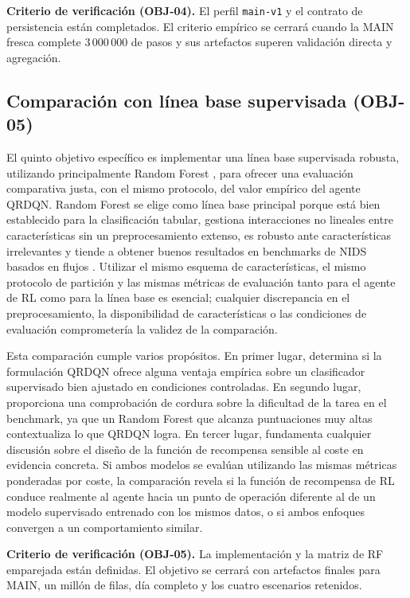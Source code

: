 \textbf{Criterio de verificación (OBJ-04).} El perfil \texttt{main-v1} y el contrato de persistencia están completados. El criterio empírico se cerrará cuando la MAIN fresca complete $3\,000\,000$ de pasos y sus artefactos superen validación directa y agregación.

\subsection{Comparación con línea base supervisada (OBJ-05)}
El quinto objetivo específico es implementar una línea base supervisada robusta, utilizando principalmente Random Forest \parencite{LiuLang2019IDSSurvey}, para ofrecer una evaluación comparativa justa, con el mismo protocolo, del valor empírico del agente QRDQN. Random Forest se elige como línea base principal porque está bien establecido para la clasificación tabular, gestiona interacciones no lineales entre características sin un preprocesamiento extenso, es robusto ante características irrelevantes y tiende a obtener buenos resultados en benchmarks de NIDS basados en flujos \parencite{Apruzzese2022CrossEvaluationNIDS}. Utilizar el mismo esquema de características, el mismo protocolo de partición y las mismas métricas de evaluación tanto para el agente de RL como para la línea base es esencial; cualquier discrepancia en el preprocesamiento, la disponibilidad de características o las condiciones de evaluación comprometería la validez de la comparación.

Esta comparación cumple varios propósitos. En primer lugar, determina si la formulación QRDQN ofrece alguna ventaja empírica sobre un clasificador supervisado bien ajustado en condiciones controladas. En segundo lugar, proporciona una comprobación de cordura sobre la dificultad de la tarea en el benchmark, ya que un Random Forest que alcanza puntuaciones muy altas contextualiza lo que QRDQN logra. En tercer lugar, fundamenta cualquier discusión sobre el diseño de la función de recompensa sensible al coste en evidencia concreta. Si ambos modelos se evalúan utilizando las mismas métricas ponderadas por coste, la comparación revela si la función de recompensa de RL conduce realmente al agente hacia un punto de operación diferente al de un modelo supervisado entrenado con los mismos datos, o si ambos enfoques convergen a un comportamiento similar.

\textbf{Criterio de verificación (OBJ-05).} La implementación y la matriz de RF emparejada están definidas. El objetivo se cerrará con artefactos finales para MAIN, un millón de filas, día completo y los cuatro escenarios retenidos.

